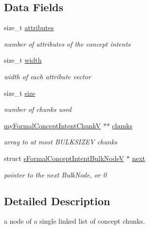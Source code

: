 \subsection*{\-Data \-Fields}
\begin{DoxyCompactItemize}
\item 
size\-\_\-t \hyperlink{structsFormalConceptIntentBulkNodeV_a0bcc56cc39eb49a954c136099d6e46e7}{attributes}
\begin{DoxyCompactList}\small\item\em number of attributes of the concept intents \end{DoxyCompactList}\item 
size\-\_\-t \hyperlink{structsFormalConceptIntentBulkNodeV_ab6c271021365b30649e33b474862f5d8}{width}
\begin{DoxyCompactList}\small\item\em width of each attribute vector \end{DoxyCompactList}\item 
size\-\_\-t \hyperlink{structsFormalConceptIntentBulkNodeV_a516403c9da58b5bedbf72f0a037d5c4f}{size}
\begin{DoxyCompactList}\small\item\em number of chunks used \end{DoxyCompactList}\item 
\hyperlink{vector_2structs_8h_abe3c190ec3375121cbfe3afff517b9b9}{my\-Formal\-Concept\-Intent\-Chunk\-V} $\ast$$\ast$ \hyperlink{structsFormalConceptIntentBulkNodeV_a0e2dad46489f048d39181e59eb1c6039}{chunks}
\begin{DoxyCompactList}\small\item\em array to at most \-B\-U\-L\-K\-S\-I\-Z\-E\-V chunks \end{DoxyCompactList}\item 
struct \*
\hyperlink{structsFormalConceptIntentBulkNodeV}{s\-Formal\-Concept\-Intent\-Bulk\-Node\-V} $\ast$ \hyperlink{structsFormalConceptIntentBulkNodeV_ac2cd46a8c3334e2d2fdbc6c203707ed8}{next}
\begin{DoxyCompactList}\small\item\em pointer to the next \-Bulk\-Node, or 0 \end{DoxyCompactList}\end{DoxyCompactItemize}


\subsection{\-Detailed \-Description}
a node of a single linked list of concept chunks. 


